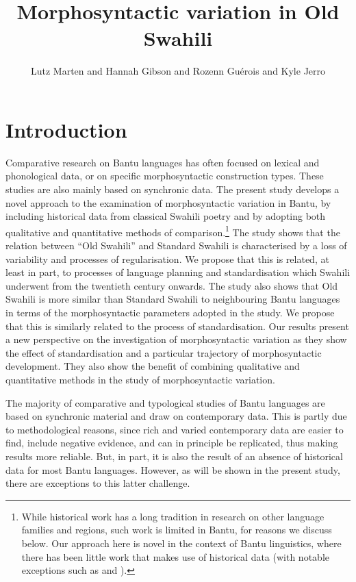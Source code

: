 \documentclass[output=paper]{langscibook}
\author{Lutz Marten\orcid{}\affiliation{SOAS University of London} and 
Hannah Gibson\orcid{0000-0003-2324-3147}\affiliation{University of Essex} and 
Rozenn Guérois\orcid{}\affiliation{LLACAN CNRS; University of KwaZulu-Natal} and 
Kyle Jerro\orcid{0000-0002-1467-2524}\affiliation{University of Essex}}
\title{Morphosyntactic variation in Old Swahili}
\begin{document}
\maketitle 


 

\section{Introduction}\label{sec:marten:1}

Comparative research on Bantu languages has often focused on lexical and phonological data, or on specific morphosyntactic construction types. These studies are also mainly based on synchronic data. The present study develops a novel approach to the examination of morphosyntactic variation in Bantu, by including historical data from classical Swahili poetry and by adopting both qualitative and quantitative methods of comparison.\footnote{While historical work has a long tradition in research on other language families and regions, such work is limited in Bantu, for reasons we discuss below. Our approach here is novel in the context of Bantu linguistics, where there has been little work that makes use of historical data (with notable exceptions such as \citealt{Balestrieri2017} and \citealt{DomBostoen2015}).} The study shows that the relation between ``Old Swahili'' and Standard Swahili is characterised by a loss of variability and processes of regularisation. We propose that this is related, at least in part, to processes of language planning and standardisation which Swahili underwent from the twentieth century onwards. The study also shows that Old Swahili is more similar than Standard Swahili to neighbouring Bantu languages in terms of the morphosyntactic parameters adopted in the study. We propose that this is similarly related to the process of standardisation. Our results present a new perspective on the investigation of morphosyntactic variation as they show the effect of standardisation and a particular trajectory of morphosyntactic development. They also show the benefit of combining qualitative and quantitative methods in the study of morphosyntactic variation.

The majority of comparative and typological studies of Bantu languages are based on synchronic material and draw on contemporary data. This is partly due to methodological reasons, since rich and varied contemporary data are easier to find, include negative evidence, and can in principle be replicated, thus making results more reliable. But, in part, it is also the result of an absence of historical data for most Bantu languages. However, as will be shown in the present study, there are exceptions to this latter challenge. 
\end{document}
